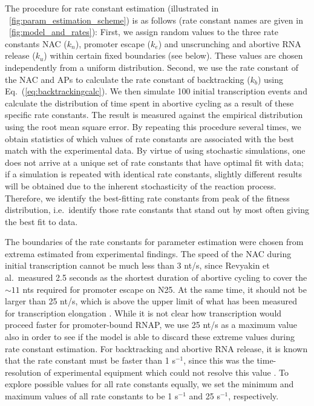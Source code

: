 The procedure for rate constant estimation (illustrated in
\FIG~\ref{fig:param_estimation_scheme}) is as follows (rate constant names
are given in \FIG~\ref{fig:model_and_rates}): First, we assign random values
to the three rate constants NAC ($k_n$), promoter escape ($k_e$) and
unscrunching and abortive RNA release ($k_u$) within certain fixed boundaries
(see below). These values are chosen independently from a uniform
distribution. Second, we use the rate constant of the NAC and APs to
calculate the rate constant of backtracking ($k_b$) using
Eq.~(\ref{eq:backtrackingcalc}). We then simulate 100 initial transcription
events and calculate the distribution of time spent in abortive cycling as a
result of these specific rate constants. The result is measured against the
empirical distribution \cite{revyakin_abortive_2006} using the root mean
square error. By repeating this procedure several times, we obtain statistics
of which values of rate constants are associated with the best match with
the experimental data. By virtue of using stochastic simulations, one does not
arrive at a unique set of rate constants that have optimal fit with data; if a
simulation is repeated with identical rate constants, slightly different
results will be obtained due to the inherent stochasticity of the reaction
process. Therefore, we identify the best-fitting rate constants from peak of
the fitness distribution, i.e.\ identify those rate constants that stand out
by most often giving the best fit to data.

The boundaries of the rate constants for parameter estimation were chosen from
extrema estimated from experimental findings. The speed of the NAC during initial
transcription cannot be much less than 3 nt/s, since Revyakin et al.\ measured
2.5 seconds as the shortest duration of abortive cycling
\cite{revyakin_abortive_2006} to cover the $\sim 11$ nts required for promoter
escape on N25. At the same time, it should not be larger than 25 nt/s,
which is above the upper limit of what has been measured for transcription
elongation \cite{bai_mechanochemical_2007}. While it is not clear how
transcription would proceed faster for promoter-bound RNAP, we use 25 nt/s as
a maximum value also in order to see if the model is able to discard these
extreme values during rate constant estimation. For backtracking and abortive
RNA release, it is known that the rate constant must be faster than 1
s$^{-1}$, since this was the time-resolution of experimental equipment which
could not resolve this value \cite{revyakin_abortive_2006}. To explore
possible values for all rate constants equally, we set the minimum and maximum
values of all rate constants to be 1 s$^{-1}$ and 25 s$^{-1}$, respectively. 

